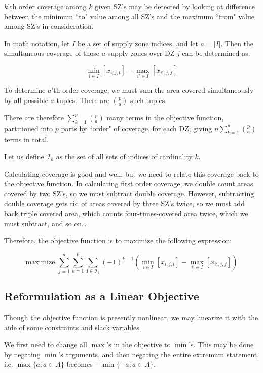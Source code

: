 \documentclass[a4paper]{article}
\begin{document}
$k$'th order coverage among $k$ given SZ's may be detected by looking at difference between the minimum ``to" value among all SZ's and the maximum ``from" value among SZ's in consideration.

In math notation, let $I$ be a set of supply zone indices, and let $a = |I|$. Then the simultaneous coverage of those $a$ supply zones over DZ $j$ can be determined as:

$$\min_{i \in I} [x_{i,j,t}] - \max_{i' \in I} [x_{i',j,f}]$$

To determine $a$'th order coverage, we must sum the area covered simultaneously by all possible $a$-tuples. There are $p\choose a$ such tuples.

There are therefore $\sum_{k=1}^p {p\choose a}$ many terms in the objective function, partitioned into $p$ parts by ``order" of coverage, for each DZ, giving $n\sum_{k=1}^p {p\choose a}$ terms in total.

Let us define $\mathcal{I}_k$ as the set of all sets of indices of cardinality $k$.

\vspace{1em}

Calculating coverage is good and well, but we need to relate this coverage back to the objective function. In calculating first order coverage, we double count areas covered by two SZ's, so we must subtract double coverage. However, subtracting double coverage gets rid of areas covered by three SZ's twice, so we must add back triple covered area, which counts four-times-covered area twice, which we must subtract, and so on\ldots

Therefore, the objective function is to maximize the following expression:

$$\textrm{maximize } \sum_{j=1}^n\sum_{k=1}^{p} \sum_{I \in \mathcal{I}_k} 
(-1)^{k-1}(\min_{i \in I} [x_{i,j,t}] - \max_{i' \in I} [x_{i',j,f}])$$

\subsection{Reformulation as a Linear Objective}

Though the objective function is presently nonlinear, we may linearize it with the aide of some constraints and slack variables.

We first need to change all $\max$'s in the objective to $\min$'s. This may be done by negating $\min$'s arguments, and then negating the entire extremum statement, i.e. $\max\{a : a \in A\}$ becomes $-\min\{-a : a \in A\}$.
\end{document}
